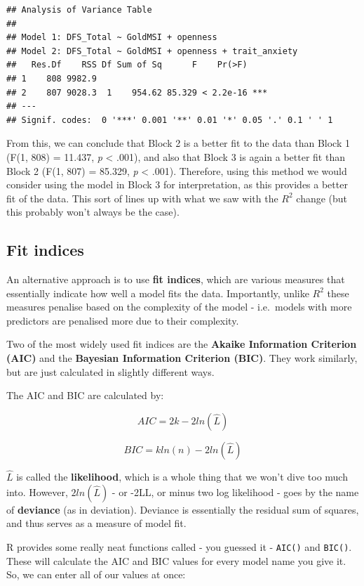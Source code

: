\documentclass[
]{book}
\begin{document}
\begin{verbatim}
## Analysis of Variance Table
## 
## Model 1: DFS_Total ~ GoldMSI + openness
## Model 2: DFS_Total ~ GoldMSI + openness + trait_anxiety
##   Res.Df    RSS Df Sum of Sq      F    Pr(>F)    
## 1    808 9982.9                                  
## 2    807 9028.3  1    954.62 85.329 < 2.2e-16 ***
## ---
## Signif. codes:  0 '***' 0.001 '**' 0.01 '*' 0.05 '.' 0.1 ' ' 1
\end{verbatim}

From this, we can conclude that Block 2 is a better fit to the data than Block 1 (F(1, 808) = 11.437, \emph{p} \textless{} .001), and also that Block 3 is again a better fit than Block 2 (F(1, 807) = 85.329, \emph{p} \textless{} .001). Therefore, using this method we would consider using the model in Block 3 for interpretation, as this provides a better fit of the data. This sort of lines up with what we saw with the \(R^2\) change (but this probably won't always be the case).

\subsection{Fit indices}\label{fit-indices}

An alternative approach is to use \textbf{fit indices}, which are various measures that essentially indicate how well a model fits the data. Importantly, unlike \(R^2\) these measures penalise based on the complexity of the model - i.e.~models with more predictors are penalised more due to their complexity.

Two of the most widely used fit indices are the \textbf{Akaike Information Criterion (AIC)} and the \textbf{Bayesian Information Criterion (BIC)}. They work similarly, but are just calculated in slightly different ways.

The AIC and BIC are calculated by:

\[
AIC = 2k -2 ln(\hat L)
\]

\[
BIC = k ln(n) - 2 ln (\hat L)
\]

\(\hat L\) is called the \textbf{likelihood}, which is a whole thing that we won't dive too much into. However, \(2 ln (\hat L)\) - or -2LL, or minus two log likelihood - goes by the name of \textbf{deviance} (as in deviation). Deviance is essentially the residual sum of squares, and thus serves as a measure of model fit.

R provides some really neat functions called - you guessed it - \texttt{AIC()} and \texttt{BIC()}. These will calculate the AIC and BIC values for every model name you give it. So, we can enter all of our values at once:
\end{document}
